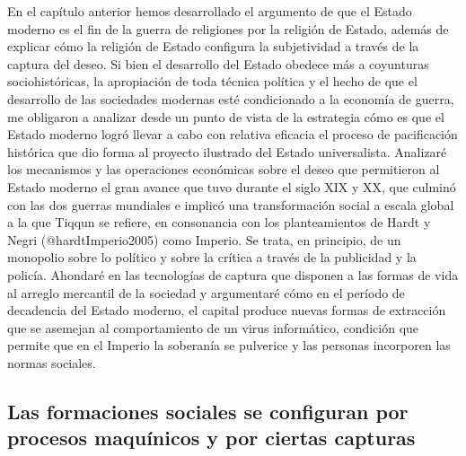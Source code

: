 \documentclass[
]{article}
\begin{document}
En el capítulo anterior hemos desarrollado el argumento de que el Estado
moderno es el fin de la guerra de religiones por la religión de Estado,
además de explicar cómo la religión de Estado configura la subjetividad
a través de la captura del deseo. Si bien el desarrollo del Estado
obedece más a coyunturas sociohistóricas, la apropiación de toda técnica
política y el hecho de que el desarrollo de las sociedades modernas esté
condicionado a la economía de guerra, me obligaron a analizar desde un
punto de vista de la estrategia cómo es que el Estado moderno logró
llevar a cabo con relativa eficacia el proceso de pacificación histórica
que dio forma al proyecto ilustrado del Estado universalista. Analizaré
los mecanismos y las operaciones económicas sobre el deseo que
permitieron al Estado moderno el gran avance que tuvo durante el siglo
XIX y XX, que culminó con las dos guerras mundiales e implicó una
transformación social a escala global a la que Tiqqun se refiere, en
consonancia con los planteamientos de Hardt y Negri (@hardtImperio2005)
como Imperio. Se trata, en principio, de un monopolio sobre lo político
y sobre la crítica a través de la publicidad y la policía. Ahondaré en
las tecnologías de captura que disponen a las formas de vida al arreglo
mercantil de la sociedad y argumentaré cómo en el período de decadencia
del Estado moderno, el capital produce nuevas formas de extracción que
se asemejan al comportamiento de un virus informático, condición que
permite que en el Imperio la soberanía se pulverice y las personas
incorporen las normas sociales.

\hypertarget{las-formaciones-sociales-se-configuran-por-procesos-maquuxednicos-y-por-ciertas-capturas}{%
\subsection{Las formaciones sociales se configuran por procesos
maquínicos y por ciertas
capturas}\label{las-formaciones-sociales-se-configuran-por-procesos-maquuxednicos-y-por-ciertas-capturas}}
\end{document}
